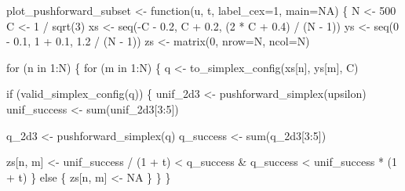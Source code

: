 \documentclass[
  letterpaper,
  DIV=11,
  numbers=noendperiod]{scrartcl}
\newenvironment{Shaded}{\begin{snugshade}}{\end{snugshade}}
\newcommand{\AttributeTok}[1]{\textcolor[rgb]{0.40,0.45,0.13}{#1}}
\newcommand{\ConstantTok}[1]{\textcolor[rgb]{0.56,0.35,0.01}{#1}}
\newcommand{\ControlFlowTok}[1]{\textcolor[rgb]{0.00,0.23,0.31}{#1}}
\newcommand{\DecValTok}[1]{\textcolor[rgb]{0.68,0.00,0.00}{#1}}
\newcommand{\FloatTok}[1]{\textcolor[rgb]{0.68,0.00,0.00}{#1}}
\newcommand{\FunctionTok}[1]{\textcolor[rgb]{0.28,0.35,0.67}{#1}}
\newcommand{\NormalTok}[1]{\textcolor[rgb]{0.00,0.23,0.31}{#1}}
\newcommand{\OtherTok}[1]{\textcolor[rgb]{0.00,0.23,0.31}{#1}}
\newcommand{\SpecialCharTok}[1]{\textcolor[rgb]{0.37,0.37,0.37}{#1}}
\begin{document}
\begin{Shaded}
\begin{Highlighting}[]
\NormalTok{plot\_pushforward\_subset }\OtherTok{\textless{}{-}} \ControlFlowTok{function}\NormalTok{(u, t, }\AttributeTok{label\_cex=}\DecValTok{1}\NormalTok{, }\AttributeTok{main=}\ConstantTok{NA}\NormalTok{) \{}
\NormalTok{  N }\OtherTok{\textless{}{-}} \DecValTok{500}
\NormalTok{  C }\OtherTok{\textless{}{-}} \DecValTok{1} \SpecialCharTok{/} \FunctionTok{sqrt}\NormalTok{(}\DecValTok{3}\NormalTok{)}
\NormalTok{  xs }\OtherTok{\textless{}{-}} \FunctionTok{seq}\NormalTok{(}\SpecialCharTok{{-}}\NormalTok{C }\SpecialCharTok{{-}} \FloatTok{0.2}\NormalTok{, C }\SpecialCharTok{+} \FloatTok{0.2}\NormalTok{, (}\DecValTok{2} \SpecialCharTok{*}\NormalTok{ C }\SpecialCharTok{+} \FloatTok{0.4}\NormalTok{) }\SpecialCharTok{/}\NormalTok{ (N }\SpecialCharTok{{-}} \DecValTok{1}\NormalTok{))}
\NormalTok{  ys }\OtherTok{\textless{}{-}} \FunctionTok{seq}\NormalTok{(}\DecValTok{0} \SpecialCharTok{{-}} \FloatTok{0.1}\NormalTok{, }\DecValTok{1} \SpecialCharTok{+} \FloatTok{0.1}\NormalTok{, }\FloatTok{1.2} \SpecialCharTok{/}\NormalTok{ (N }\SpecialCharTok{{-}} \DecValTok{1}\NormalTok{))}
\NormalTok{  zs }\OtherTok{\textless{}{-}} \FunctionTok{matrix}\NormalTok{(}\DecValTok{0}\NormalTok{, }\AttributeTok{nrow=}\NormalTok{N, }\AttributeTok{ncol=}\NormalTok{N)}

  \ControlFlowTok{for}\NormalTok{ (n }\ControlFlowTok{in} \DecValTok{1}\SpecialCharTok{:}\NormalTok{N) \{}
    \ControlFlowTok{for}\NormalTok{ (m }\ControlFlowTok{in} \DecValTok{1}\SpecialCharTok{:}\NormalTok{N) \{}
\NormalTok{      q }\OtherTok{\textless{}{-}} \FunctionTok{to\_simplex\_config}\NormalTok{(xs[n], ys[m], C)}

      \ControlFlowTok{if}\NormalTok{ (}\FunctionTok{valid\_simplex\_config}\NormalTok{(q)) \{}
\NormalTok{        unif\_2d3 }\OtherTok{\textless{}{-}} \FunctionTok{pushforward\_simplex}\NormalTok{(upsilon)}
\NormalTok{        unif\_success }\OtherTok{\textless{}{-}} \FunctionTok{sum}\NormalTok{(unif\_2d3[}\DecValTok{3}\SpecialCharTok{:}\DecValTok{5}\NormalTok{])}

\NormalTok{        q\_2d3 }\OtherTok{\textless{}{-}} \FunctionTok{pushforward\_simplex}\NormalTok{(q)}
\NormalTok{        q\_success }\OtherTok{\textless{}{-}} \FunctionTok{sum}\NormalTok{(q\_2d3[}\DecValTok{3}\SpecialCharTok{:}\DecValTok{5}\NormalTok{])}

\NormalTok{        zs[n, m] }\OtherTok{\textless{}{-}}\NormalTok{ unif\_success }\SpecialCharTok{/}\NormalTok{ (}\DecValTok{1} \SpecialCharTok{+}\NormalTok{ t) }\SpecialCharTok{\textless{}}\NormalTok{ q\_success }\SpecialCharTok{\&}
\NormalTok{                    q\_success }\SpecialCharTok{\textless{}}\NormalTok{ unif\_success }\SpecialCharTok{*}\NormalTok{ (}\DecValTok{1} \SpecialCharTok{+}\NormalTok{ t)}
\NormalTok{      \} }\ControlFlowTok{else}\NormalTok{ \{}
\NormalTok{        zs[n, m] }\OtherTok{\textless{}{-}} \ConstantTok{NA}
\NormalTok{      \}}
\NormalTok{    \}}
\NormalTok{  \}}


\end{Highlighting}
\end{Shaded}
\end{document}
